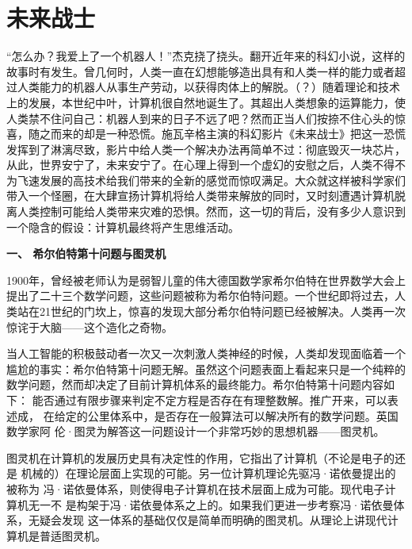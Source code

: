 \chapter{未来战士}

\subtitle{——试论计算机与思维的几个问题}

“怎么办？我爱上了一个机器人！”杰克挠了挠头。翻开近年来的科幻小说，这样的
故事时有发生。曾几何时，人类一直在幻想能够造出具有和人类一样的能力或者超
过人类能力的机器人从事生产劳动，以获得肉体上的解脱。（？）随着理论和技术
上的发展，本世纪中叶，计算机很自然地诞生了。其超出人类想象的运算能力，使
人类禁不住问自己：机器人到来的日子不远了吧？然而正当人们按捺不住心头的惊
喜，随之而来的却是一种恐慌。施瓦辛格主演的科幻影片《未来战士》把这一恐慌
发挥到了淋漓尽致，影片中给人类一个解决办法再简单不过：彻底毁灭一块芯片，
从此，世界安宁了，未来安宁了。在心理上得到一个虚幻的安慰之后，人类不得不
为飞速发展的高技术给我们带来的全新的感觉而惊叹满足。大众就这样被科学家们
带入一个怪圈，在大肆宣扬计算机将给人类带来解放的同时，又时刻遭遇计算机脱
离人类控制可能给人类带来灾难的恐惧。然而，这一切的背后，没有多少人意识到
一个隐含的假设：计算机最终将产生思维活动。

\textbf{一、 希尔伯特第十问题与图灵机}

1900年，曾经被老师认为是弱智儿童的伟大德国数学家希尔伯特在世界数学大会上
提出了二十三个数学问题，这些问题被称为希尔伯特问题。一个世纪即将过去，人
类站在21世纪的门坎上，惊喜的发现大部分希尔伯特问题已经被解决。人类再一次
惊诧于大脑——这个造化之奇物。

当人工智能的积极鼓动者一次又一次刺激人类神经的时候，人类却发现面临着一个
尴尬的事实：希尔伯特第十问题无解。虽然这个问题表面上看起来只是一个纯粹的
数学问题，然而却决定了目前计算机体系的最终能力。希尔伯特第十问题内容如下：
能否通过有限步骤来判定不定方程是否存在有理整数解。推广开来，可以表述成，
在给定的公里体系中，是否存在一般算法可以解决所有的数学问题。英国数学家阿
伦·图灵为解答这一问题设计一个非常巧妙的思想机器——图灵机。

图灵机在计算机的发展历史具有决定性的作用，它指出了计算机（不论是电子的还是
机械的）在理论层面上实现的可能。另一位计算机理论先驱冯·诺依曼提出的被称为
冯·诺依曼体系，则使得电子计算机在技术层面上成为可能。现代电子计算机无一不
是构架于冯·诺依曼体系之上的。如果我们更进一步考察冯·诺依曼体系，无疑会发现
这一体系的基础仅仅是简单而明确的图灵机。从理论上讲现代计算机是普适图灵机。

